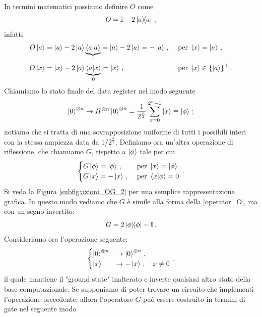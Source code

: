 In termini matematici possiamo definire $O$ come
\begin{equation}\label{operator_O}
    O=\mathbb{I}-2\op{a}{a} \, ,
\end{equation}
infatti
\begin{align*}
    O\ket a &= \ket a -2\ket{a}\underbrace{\ip{a}{a}}_{1}= \ket a - 2\ket{a} = -\ket{a} \, , &\text{ per } \ket{x} &= \ket{a} \, , \\
    O\ket x &= \ket x -2\ket{a}\underbrace{\ip{a}{x}}_{0}= \ket{x} \, , &\text{ per } \ket{x} &\in \{ \ket{a} \}^\perp \, .
\end{align*}
Chiamiamo lo stato finale del data register nel modo seguente 
\begin{equation}\label{sovrapposizione_phi}
    \ket{0}^{\otimes n}\rightarrow H^{\otimes n}\ket{0}^{\otimes n}=\frac{1}{2^{\frac n2}}\sum_{x=0}^{2^n-1} \ket{x} \equiv \ket\phi \, ;
\end{equation}
notiamo che si tratta di una sovrapposizione uniforme di tutti i possibili interi con la stessa ampiezza data da $1/2^{\frac{n}{2}}$. Definiamo ora un'altra operazione di riflessione, che chiamiamo $G$, rispetto a $\ket\phi$ tale per cui
\begin{equation*}
    \begin{cases}
        G\ket\phi=\ket\phi \, , &\text{ per }\ket{x} = \ket{\phi} \\
        G\ket x=-\ket x \, , &\text{ per } \ip{x}{\phi} = 0
    \end{cases} \, .
\end{equation*}
Si veda la Figura \ref{subfig:azioni_OG_2} per una semplice rappresentazione grafica. In questo modo vediamo che $G$ è simile alla forma della \eqref{operator_O}, ma con un segno invertito:
\begin{equation}\label{operator_G}
    G=2\op{\phi}{\phi}-\mathbb{I} \, .
\end{equation}
Consideriamo ora l'operazione seguente:
\begin{equation}\label{operatore_incognito}
    \begin{cases}
        \ket{0}^{\otimes n} &\rightarrow \ket{0}^{\otimes n} \, , \\
        \ket{x} &\rightarrow -\ket{x} \, , \quad x  \neq 0
    \end{cases} \, ,
\end{equation}
il quale mantiene il "ground state" inalterato e inverte qualsiasi altro stato della base computazionale. Se supponiamo di poter trovare un circuito che implementi l'operazione precedente, allora l'operatore $G$ può essere costruito in termini di gate nel seguente modo
